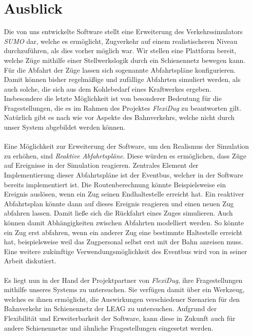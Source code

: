 \section{Ausblick}

Die von uns entwickelte Software stellt eine Erweiterung des Verkehrssimulators \emph{SUMO} dar, welche es ermöglicht, Zugverkehr auf einem realistischeren Niveau durchzuführen, als dies vorher möglich war. Wir stellen eine Plattform bereit, welche Züge mithilfe einer Stellwerkslogik durch ein Schienennetz bewegen kann. Für die Abfahrt der Züge lassen sich sogenannte Abfahrtspläne konfigurieren. Damit können bisher regelmäßige und zufällige Abfahrten simuliert werden, als auch solche, die sich aus dem Kohlebedarf eines Kraftwerkes ergeben. Insbesondere die letzte Möglichkeit ist von besonderer Bedeutung für die Fragestellungen, die es im Rahmen des Projektes \emph{FlexiDug} zu beantworten gilt. Natürlich gibt es nach wie vor Aspekte des Bahnverkehrs, welche nicht durch unser System abgebildet werden können.\\
\\
Eine Möglichkeit zur Erweiterung der Software, um den Realismus der Simulation zu erhöhen, sind \emph{Reaktive Abfahrtspläne}. Diese würden es ermöglichen, dass Züge auf Ereignisse in der Simulation reagieren. Zentrales Element der Implementierung dieser Abfahrtspläne ist der Eventbus, welcher in der Software bereits implementiert ist. Die Routenberechnung könnte Beispielsweise ein Ereignis auslösen, wenn ein Zug seinen Endhaltestelle erreicht hat. Ein reaktiver Abfahrtsplan könnte dann auf dieses Ereignis reagieren und einen neuen Zug abfahren lassen. Damit ließe sich die Rückfahrt eines Zuges simulieren. Auch können damit Abhängigkeiten zwischen Abfahrten modelliert werden. So könnte ein Zug erst abfahren, wenn ein anderer Zug eine bestimmte Haltestelle erreicht hat, beispielsweise weil das Zugpersonal selbst erst mit der Bahn anreisen muss. Eine weitere zukünftige Verwendungsmöglichkeit des Eventbus wird von \citeauthor{persitzky_fehlerinjektion_2023} in seiner Arbeit \cite{persitzky_fehlerinjektion_2023} diskutiert.\\
\\
Es liegt nun in der Hand der Projektpartner von \emph{FlexiDug}, ihre Fragestellungen mithilfe unseres Systems zu untersuchen. Sie verfügen damit über ein Werkzeug, welches es ihnen ermöglicht, die Auswirkungen verschiedener Szenarien für den Bahnverkehr im Schienennetz der LEAG zu untersuchen. Aufgrund der Flexibilität und Erweiterbarkeit der Software, kann diese in Zukunft auch für andere Schienennetze und ähnliche Fragestellungen eingesetzt werden.
